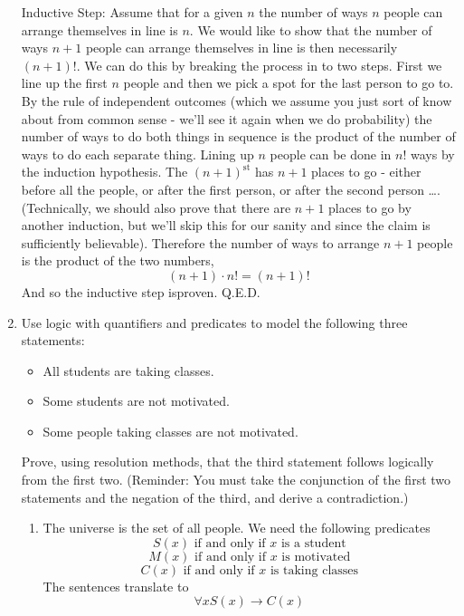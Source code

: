 \documentclass[12pt]{amsart}
\begin{document}
\begin{enumerate}
    Inductive Step: Assume that for a given $n$ the number of ways $n$ people
    can arrange themselves in line is $n$. We would like to
    show that the number of ways $n+1$ people can arrange themselves in line
    is then necessarily $(n+1)!$. We can do this by breaking the
    process in to two steps. First we line up the first $n$ people
    and then we pick a spot for the last person to go to. By the
    rule of independent outcomes (which we assume you just sort of know
    about from common sense - we'll see it again when we do probability)
    the number of ways to do both things in sequence is the product
    of the number of ways to do each separate thing. Lining up $n$ people
    can be done in $n!$ ways by the induction hypothesis. The $(n+1)^{\text{st}}$
    has $n+1$ places to go - either before all the people, or after the
    first person, or after the second person \ldots. (Technically, we should
    also prove that there are $n+1$ places to go by another induction, but
    we'll skip this for our sanity and since the claim is sufficiently
    believable).  Therefore the number
    of ways to arrange $n+1$ people is the product of the two numbers,
    \[
    (n+1)\cdot n! = (n+1)!
    \]
    And so the inductive step isproven. Q.E.D.
\item
    Use logic with quantifiers and predicates to model the following
    three statements:
    \begin{itemize}
        \item All students are taking classes.
        \item Some students are not motivated.
        \item Some people taking classes are not motivated.
    \end{itemize}
    Prove, using resolution methods, that the third statement follows
    logically from the first two. (Reminder: You must take the conjunction
    of the first two statements and the negation of the third, and
    derive a contradiction.)\\
    \begin{enumerate}
    \item
        The universe is the set of all people. We need the following
        predicates
        \[
        S(x) \text{ if and only if $x$ is a student}
        \]
        \[
        M(x) \text{ if and only if $x$ is motivated}
        \]
        \[
        C(x) \text{ if and only if $x$ is taking classes}
        \]
    The sentences translate to
        \[
        \forall x S(x) \rightarrow C(x)
\]
\end{enumerate}
\end{enumerate}
\end{document}
